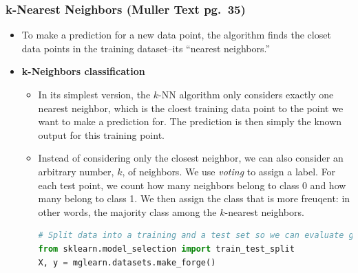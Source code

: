 \documentclass{article}
\begin{document}
\subsubsection*{k-Nearest Neighbors (Muller Text pg.\ 35)}
\begin{itemize}
    \item To make a prediction for a new data point, the algorithm finds the closet data points in the training dataset--its ``nearest neighbors.''
    \item \textbf{k-Neighbors classification}
    \begin{itemize}
        \item In its simplest version, the $k$-NN algorithm only considers exactly one nearest neighbor, which is the cloest training data point to the point we want to make a prediction for. The prediction is then simply the known output for this training point.
        \item Instead of considering only the closest neighbor, we can also consider an arbitrary number, $k$, of neighbors. We use \emph{voting} to assign a label. For each test point, we count how many neighbors belong to class 0 and how many belong to class 1. We then assign the class that is more freuqent: in other words, the majority class among the $k$-nearest neighbors.
\begin{lstlisting}[language = Python]
# Split data into a training and a test set so we can evaluate generalization performance
from sklearn.model_selection import train_test_split
X, y = mglearn.datasets.make_forge()


\end{lstlisting}
\end{itemize}
\end{itemize}
\end{document}
